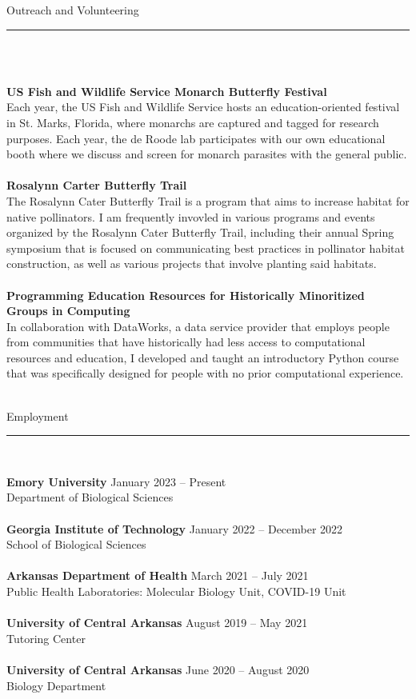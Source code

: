 \documentclass{article}
\begin{document}
\begin{flushleft}
{\Large Outreach and Volunteering} \rule{16.51cm}{0.4pt}\\
\end{flushleft}
\\
\textbf{US Fish and Wildlife Service Monarch Butterfly Festival}\\
Each year, the US Fish and Wildlife Service hosts an education-oriented festival in St. Marks, Florida, where
monarchs are captured and tagged for research purposes. Each year, the de Roode lab participates with our own 
educational booth where we discuss and screen for monarch parasites with the general public. \\
\\
\textbf{Rosalynn Carter Butterfly Trail}\\
The Rosalynn Cater Butterfly Trail is a program that aims to increase habitat for native pollinators. I am frequently
invovled in various programs and events organized by the Rosalynn Cater Butterfly Trail, including their annual Spring
symposium that is focused on communicating best practices in pollinator habitat construction, as well as various projects
that involve planting said habitats. \\
\\
\textbf{Programming Education Resources for Historically Minoritized Groups in Computing}\\
In collaboration with DataWorks, a data service provider that employs people from communities that have historically 
had less access to computational resources and education, I developed and taught an introductory Python course that was specifically
designed for people with no prior computational experience.
\\
\\
\begin{flushleft}
{\Large Employment} \rule{16.51cm}{0.4pt}\\
\end{flushleft}
\textbf{Emory University} \hfill January 2023 – Present\\
Department of Biological Sciences \\
\\
\textbf{Georgia Institute of Technology} \hfill January 2022 – December 2022\\
School of Biological Sciences \\
\\
\textbf{Arkansas Department of Health} \hfill March 2021 – July 2021\\
Public Health Laboratories: Molecular Biology Unit, COVID-19 Unit\\
\\
\textbf{University of Central Arkansas} \hfill August 2019 – May 2021\\
Tutoring Center\\
\\
\textbf{University of Central Arkansas} \hfill June 2020 – August 2020\\
Biology Department\\
\end{document}
